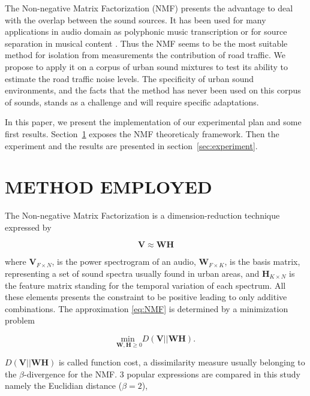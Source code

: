 \documentclass{article}
\begin{document}
\begin{sloppy}
The Non-negative Matrix Factorization (NMF) \cite{lee1999} presents the advantage to deal with the overlap between the sound sources. It has been used for many applications in audio domain as polyphonic music transcription \cite{smaragdis2003} or for source separation in musical content \cite{Virtanen2005}. Thus the NMF seems to be the most suitable method for isolation from measurements the contribution of road traffic. We propose to apply it on a corpus of urban sound mixtures to test its ability to estimate the road traffic noise levels. The specificity of urban sound environments, and the facts that the method has never been used on this corpus of sounds, stands as a challenge and will require specific adaptations.

In this paper, we present the implementation of our experimental plan and some first results. Section~\ref{sec:method} exposes the NMF theoreticaly framework. Then the experiment and the results are presented in section~\ref{sec:experiment}.


\section{METHOD EMPLOYED}\label{sec:method}
The Non-negative Matrix Factorization \cite{lee1999} is a dimension-reduction technique expressed by

\begin{equation}\label{eq:NMF}
\mathbf{V} \approx \mathbf{WH}
\end{equation}

where $\mathbf{V}_{F \times N}$, is the power spectrogram of an audio, $\mathbf{W}_{F \times K}$, is the basis matrix, representing a set of sound spectra usually found in urban areas, and $\mathbf{H}_{K \times N}$ is the feature matrix standing for the temporal variation of each spectrum. All these elements presents the constraint to be positive leading to only additive combinations. The approximation \ref{eq:NMF} is determined by a minimization problem

\begin{equation}\label{eq:minCost}
\underset{\mathbf{W},\mathbf{H} \geq 0}{\text{min }} D(\mathbf{V}\vert\vert \mathbf{WH}).
\end{equation}

$D(\mathbf{V}\vert\vert \mathbf{WH})$ is called function cost, a dissimilarity measure usually belonging to the $\beta$-divergence for the NMF. 3 popular expressions are compared in this study namely the Euclidian distance ($\beta = 2$),


\end{sloppy}
\end{document}
